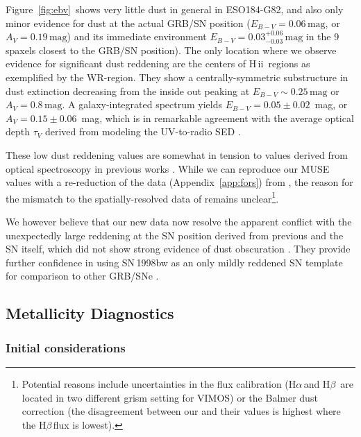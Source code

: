 \documentclass[traditabstract]{aa}
\newcommand{\hb}{H$\beta$}
\newcommand{\ha}{H$\alpha$}
\newcommand{\hii}{\mbox{H\,{\sc ii}}}
\begin{document}
Figure~\ref{fig:ebv}~shows very little dust in general in ESO184-G82, and also only minor evidence for dust at the actual GRB/SN position ($E_{B-V} = 0.06\,\mathrm{mag}$, or $A_V = 0.19\,\mathrm{mag}$) and its immediate environment $E_{B-V} = 0.03_{-0.03}^{+0.06}\,\mathrm{mag}$ in the 9 spaxels closest to the GRB/SN position). The only location where we observe evidence for significant dust reddening are the centers of \hii\, regions as exemplified by the WR-region. They show a centrally-symmetric substructure in dust extinction decreasing from the inside out peaking at $E_{B-V} \sim 0.25\,\mathrm{mag}$ or $A_V = 0.8\,\mathrm{mag}$. A galaxy-integrated spectrum yields $E_{B-V} = 0.05\pm0.02$~mag, or $A_V=0.15\pm0.06$~mag, which is in remarkable agreement with the average optical depth $\tau_V$ derived from modeling the UV-to-radio SED \citep{2014A&A...562A..70M}.

These low dust reddening values are somewhat in tension to values derived from optical spectroscopy in previous works \citep{2006A&A...454..103H, 2008A&A...490...45C}. While we can reproduce our MUSE values with a re-reduction of the data (Appendix~\ref{app:fors}) from \citet{2006A&A...454..103H}, the reason for the mismatch to the spatially-resolved data of \citet{2008A&A...490...45C} remains unclear\footnote{Potential reasons include uncertainties in the flux calibration (\ha\,and \hb\, are located in two different grism setting for VIMOS) or the Balmer dust correction (the disagreement between our and their values is highest where the \hb\,flux is lowest).}.

We however believe that our new data now resolve the apparent conflict with the unexpectedly large reddening at the SN position derived from previous  and the SN itself, which did not show strong evidence of dust obscuration \citep[e.g.][]{1998Natur.395..672I, 2001ApJ...555..900P}. They provide further confidence in using SN\,1998bw as an only mildly reddened SN template for comparison to other GRB/SNe \citep[e.g.][and references therein]{2004ApJ...609..952Z, 2014A&A...566A.102S, 2016arXiv160606791K}.

\subsection{Metallicity Diagnostics}

\subsubsection{Initial considerations}
\end{document}
